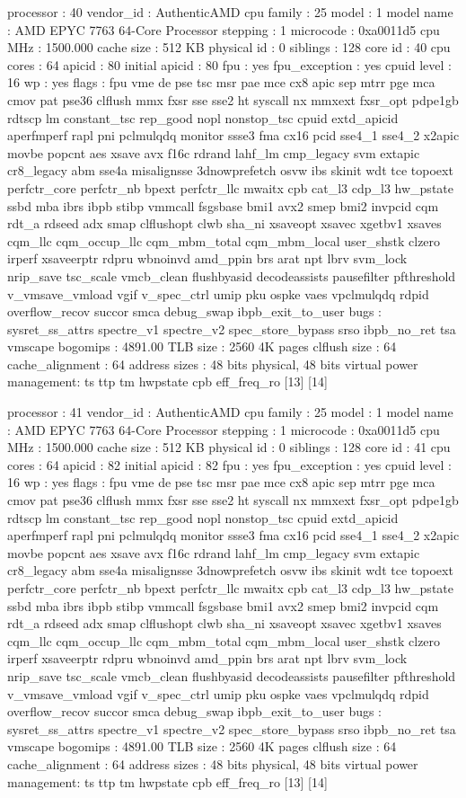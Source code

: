 processor	: 40
vendor_id	: AuthenticAMD
cpu family	: 25
model		: 1
model name	: AMD EPYC 7763 64-Core Processor
stepping	: 1
microcode	: 0xa0011d5
cpu MHz		: 1500.000
cache size	: 512 KB
physical id	: 0
siblings	: 128
core id		: 40
cpu cores	: 64
apicid		: 80
initial apicid	: 80
fpu		: yes
fpu_exception	: yes
cpuid level	: 16
wp		: yes
flags		: fpu vme de pse tsc msr pae mce cx8 apic sep mtrr pge mca cmov pat pse36 clflush mmx fxsr sse sse2 ht syscall nx mmxext fxsr_opt pdpe1gb rdtscp lm constant_tsc rep_good nopl nonstop_tsc cpuid extd_apicid aperfmperf rapl pni pclmulqdq monitor ssse3 fma cx16 pcid sse4_1 sse4_2 x2apic movbe popcnt aes xsave avx f16c rdrand lahf_lm cmp_legacy svm extapic cr8_legacy abm sse4a misalignsse 3dnowprefetch osvw ibs skinit wdt tce topoext perfctr_core perfctr_nb bpext perfctr_llc mwaitx cpb cat_l3 cdp_l3 hw_pstate ssbd mba ibrs ibpb stibp vmmcall fsgsbase bmi1 avx2 smep bmi2 invpcid cqm rdt_a rdseed adx smap clflushopt clwb sha_ni xsaveopt xsavec xgetbv1 xsaves cqm_llc cqm_occup_llc cqm_mbm_total cqm_mbm_local user_shstk clzero irperf xsaveerptr rdpru wbnoinvd amd_ppin brs arat npt lbrv svm_lock nrip_save tsc_scale vmcb_clean flushbyasid decodeassists pausefilter pfthreshold v_vmsave_vmload vgif v_spec_ctrl umip pku ospke vaes vpclmulqdq rdpid overflow_recov succor smca debug_swap ibpb_exit_to_user
bugs		: sysret_ss_attrs spectre_v1 spectre_v2 spec_store_bypass srso ibpb_no_ret tsa vmscape
bogomips	: 4891.00
TLB size	: 2560 4K pages
clflush size	: 64
cache_alignment	: 64
address sizes	: 48 bits physical, 48 bits virtual
power management: ts ttp tm hwpstate cpb eff_freq_ro [13] [14]

processor	: 41
vendor_id	: AuthenticAMD
cpu family	: 25
model		: 1
model name	: AMD EPYC 7763 64-Core Processor
stepping	: 1
microcode	: 0xa0011d5
cpu MHz		: 1500.000
cache size	: 512 KB
physical id	: 0
siblings	: 128
core id		: 41
cpu cores	: 64
apicid		: 82
initial apicid	: 82
fpu		: yes
fpu_exception	: yes
cpuid level	: 16
wp		: yes
flags		: fpu vme de pse tsc msr pae mce cx8 apic sep mtrr pge mca cmov pat pse36 clflush mmx fxsr sse sse2 ht syscall nx mmxext fxsr_opt pdpe1gb rdtscp lm constant_tsc rep_good nopl nonstop_tsc cpuid extd_apicid aperfmperf rapl pni pclmulqdq monitor ssse3 fma cx16 pcid sse4_1 sse4_2 x2apic movbe popcnt aes xsave avx f16c rdrand lahf_lm cmp_legacy svm extapic cr8_legacy abm sse4a misalignsse 3dnowprefetch osvw ibs skinit wdt tce topoext perfctr_core perfctr_nb bpext perfctr_llc mwaitx cpb cat_l3 cdp_l3 hw_pstate ssbd mba ibrs ibpb stibp vmmcall fsgsbase bmi1 avx2 smep bmi2 invpcid cqm rdt_a rdseed adx smap clflushopt clwb sha_ni xsaveopt xsavec xgetbv1 xsaves cqm_llc cqm_occup_llc cqm_mbm_total cqm_mbm_local user_shstk clzero irperf xsaveerptr rdpru wbnoinvd amd_ppin brs arat npt lbrv svm_lock nrip_save tsc_scale vmcb_clean flushbyasid decodeassists pausefilter pfthreshold v_vmsave_vmload vgif v_spec_ctrl umip pku ospke vaes vpclmulqdq rdpid overflow_recov succor smca debug_swap ibpb_exit_to_user
bugs		: sysret_ss_attrs spectre_v1 spectre_v2 spec_store_bypass srso ibpb_no_ret tsa vmscape
bogomips	: 4891.00
TLB size	: 2560 4K pages
clflush size	: 64
cache_alignment	: 64
address sizes	: 48 bits physical, 48 bits virtual
power management: ts ttp tm hwpstate cpb eff_freq_ro [13] [14]

